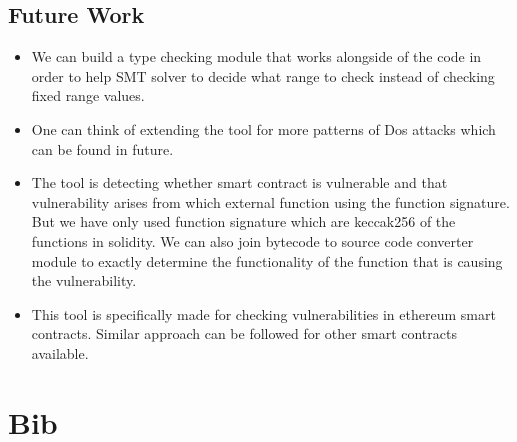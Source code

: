 \documentclass{article}
\begin{document}
\subsection*{Future Work}
\begin{itemize}
    \item We can build a type checking module that works alongside of the code in order to help SMT solver to decide what range to check instead of checking fixed range values.
    \item One can think of extending the tool for more patterns of Dos attacks which can be found in future.
    \item The tool is detecting whether smart contract is vulnerable and that vulnerability arises from which external function using the function signature. But we have only used function signature which are keccak256 of the functions in solidity. We can also join bytecode to source code converter module to exactly determine the functionality of the function that is causing the vulnerability.
    \item This tool is specifically made for checking vulnerabilities in ethereum smart contracts. Similar approach can be followed for other smart contracts available. 
\end{itemize}
\newpage
\section{Bib}
\end{document}
